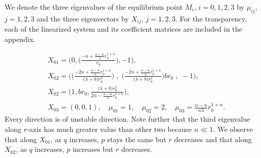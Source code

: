 \documentclass[a4paper,11pt]{article}
\begin{document}
We denote the three eigenvalues of the equilibrium point $M_i$, $i=0,1,2,3$ by $\mu_{ij}$, $j=1,2,3$ and the three eigenvectors by $X_{ij}$, $j=1,2,3$. For the transparency, each of the linearized system and its coefficient matrices are included in the appendix. \medskip

\begin{align*}
&X_{01} = \bigg(0, \Big(\frac{-n+ \frac{\alpha-n}{\lambda}r_0^{1+n}}{r_0}\Big), -1\bigg), \quad\\
 &X_{02} = \bigg( \Big( \frac{-2n + \frac{\alpha-n}{\lambda}r_0^{1+n}}{\big({\lambda}+b\big) r_0^2}\Big) \;,\;\Big( \frac{-2n + \frac{\alpha-n}{\lambda}r_0^{1+n}}{\big({\lambda}+b\big) r_0^2}\Big)br_0\;,\;-1\bigg),\\
&X_{02} = \bigg( 1, br_0, \frac{\big({\lambda}+b\big) r_0^2}{2n - \frac{\alpha-n}{\lambda}r_0^{1+n}}\bigg),\\
 &X_{03} = (0,0,1), \quad \mu_{01} = 1, \quad \mu_{02}= 2, \quad \mu_{03} = \frac{\alpha-n}{n\lambda}r_0^{1+n}.
\end{align*}
Every direction is of unstable direction. Note further that the third eigenvalue along $r$-axis has much greater value than other two because $n \ll 1$. We observe that along $X_{01}$, as $q$ increases, $p$ stays the same but $r$ decreases and that along $X_{02}$, as $q$ increases, $p$ increases but $r$ decreases.
\medskip
\end{document}
